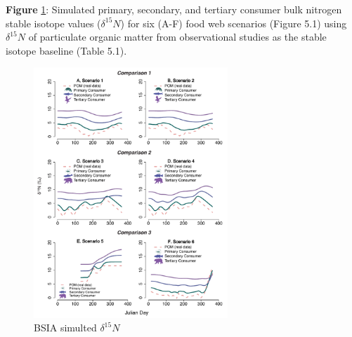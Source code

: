 \documentclass [11pt, proquest] {uwthesis}[2015/03/03]
\begin{document}
\textbf{Figure} \ref{fig:BSIA15N}: Simulated primary, secondary, and
tertiary consumer bulk nitrogen stable isotope values (\(\delta^{15}N\))
for six (A-F) food web scenarios (Figure 5.1) using \(\delta^{15}N\) of
particulate organic matter from observational studies as the stable
isotope baseline (Table 5.1).\\
\newline 
\begin{figure}[h]
\centering
  \includegraphics[width=0.65\textwidth]{figure/Ch5/Figure4.pdf}
  \caption{BSIA simulted $\delta^{15}N$}
  \label{fig:BSIA15N}
\end{figure}
\clearpage
\end{document}
